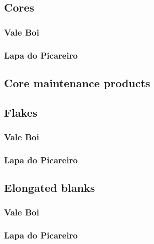 \documentclass[12pt,twoside]{reedthesis}
\begin{document}
\hypertarget{cores}{%
\subsection{Cores}\label{cores}}

\hypertarget{vale-boi-4}{%
\subsubsection{Vale Boi}\label{vale-boi-4}}

\hypertarget{lapa-do-picareiro-4}{%
\subsubsection{Lapa do Picareiro}\label{lapa-do-picareiro-4}}

\hypertarget{core-maintenance-products}{%
\subsection{Core maintenance products}\label{core-maintenance-products}}

\hypertarget{flakes}{%
\subsection{Flakes}\label{flakes}}

\hypertarget{vale-boi-5}{%
\subsubsection{Vale Boi}\label{vale-boi-5}}

\hypertarget{lapa-do-picareiro-5}{%
\subsubsection{Lapa do Picareiro}\label{lapa-do-picareiro-5}}

\hypertarget{elongated-blanks}{%
\subsection{Elongated blanks}\label{elongated-blanks}}

\hypertarget{vale-boi-6}{%
\subsubsection{Vale Boi}\label{vale-boi-6}}

\hypertarget{lapa-do-picareiro-6}{%
\subsubsection{Lapa do Picareiro}\label{lapa-do-picareiro-6}}
\end{document}
